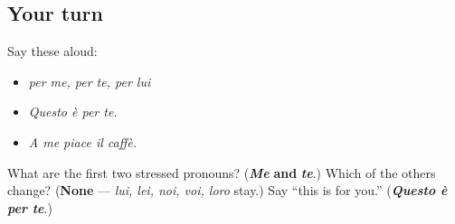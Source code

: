 \subsection*{Your turn}
Say these aloud:

\begin{itemize}
\raggedright
  \item \emph{per me, per te, per lui}
  \item \emph{Questo è per te.}
  \item \emph{A me piace il caffè.}
\end{itemize}

\begin{tcolorbox}[breakable,colback=teal!4,colframe=teal!35!black,title={Before you move on}]
What are the first two stressed pronouns? (\emph{\textbf{Me}} \textbf{and} \emph{\textbf{te}}.) Which of the others change? (\textbf{None} — \emph{lui, lei, noi, voi, loro} stay.) Say \textquotedblleft{}this is for you.\textquotedblright{} (\emph{\textbf{Questo è per te}}.)
\end{tcolorbox}
